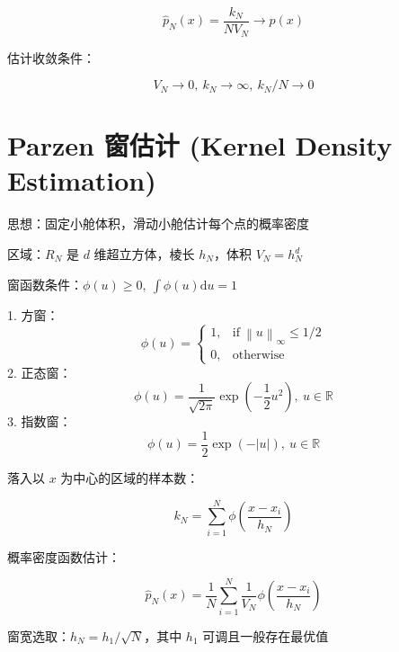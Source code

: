 \documentclass[openany,a4paper,12pt]{ctexbook}
\theoremstyle{kaiti}
\theoremstyle{normal}
\begin{document}
\begin{equation}
\hat{p}_N(x)
=\frac{k_N}{NV_N}
\rightarrow p(x)
\end{equation}

估计收敛条件：

\begin{equation}
V_N\rightarrow 0,~k_N\rightarrow \infty ,~k_N/N\rightarrow 0
\end{equation}

\section{Parzen 窗估计 (Kernel Density Estimation) }

思想：固定小舱体积，滑动小舱估计每个点的概率密度

区域：$R_N$ 是 $d$ 维超立方体，棱长 $h_N$，体积 $V_N=h_{N}^{d}$

窗函数条件：$\displaystyle\phi \left(u \right)\geqslant 0,~\int{\phi \left(u \right)\mathrm{d}u}=1$

1. 方窗：
  \begin{equation}
  \phi \left(u \right)=
  \begin{cases}
    1, &\mathrm{if}~\left\| u \right\|_{\infty}\leqslant 1/2\\
    0, &\mathrm{otherwise}
  \end{cases}
  \end{equation}
2. 正态窗：
  \begin{equation}
  \phi \left(u \right)=\frac{1}{\sqrt{2\pi}}\exp \left(-\frac{1}{2}u^2 \right),~u\in\mathbb{R}
  \end{equation}
3. 指数窗：
  \begin{equation}
  \phi \left(u \right)=\frac{1}{2}\exp \left(-|u| \right),~u\in\mathbb{R}
  \end{equation}

落入以 $x$ 为中心的区域的样本数：

\begin{equation}
k_N=\sum_{i=1}^N{\phi \left(\frac{x-x_i}{h_N} \right)}
\end{equation}

概率密度函数估计：

\begin{equation}
\hat{p}_N(x)=\frac{1}{N}\sum_{i=1}^N{\frac{1}{V_N}\phi \left(\frac{x-x_i}{h_N} \right)}
\end{equation}

窗宽选取：$h_N=h_1/\sqrt{N}$，其中 $h_1$ 可调且一般存在最优值
\end{document}
